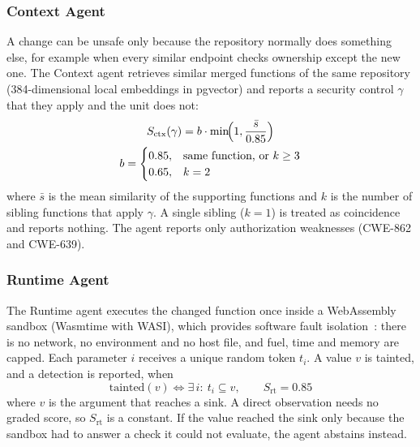 \documentclass[conference]{IEEEtran}
\begin{document}
\subsubsection{Context Agent}
A change can be unsafe only because the repository normally does something
else, for example when every similar endpoint checks ownership except the
new one. The Context agent retrieves similar merged functions of the same
repository (384-dimensional local embeddings in pgvector) and reports a
security control $\gamma$ that they apply and the unit does not:
\begin{equation}
\begin{gathered}
S_{\mathrm{ctx}}(\gamma)=b\cdot\min\!\Bigl(1,\frac{\bar{s}}{0.85}\Bigr)\\
b=\begin{cases}0.85,&\text{same function, or } k\ge3\\0.65,&k=2\end{cases}
\end{gathered}
\label{eq:ctx}
\end{equation}
where $\bar{s}$ is the mean similarity of the supporting functions and $k$
is the number of sibling functions that apply $\gamma$. A single sibling
($k=1$) is treated as coincidence and reports nothing. The agent reports
only authorization weaknesses (CWE-862 and CWE-639).

\subsubsection{Runtime Agent}
The Runtime agent executes the changed function once inside a
WebAssembly~\cite{haas2017wasm} sandbox (Wasmtime with WASI), which
provides software fault isolation~\cite{wahbe1993sfi}: there is no network,
no environment and no host file, and fuel, time and memory are capped.
Each parameter $i$ receives a unique random token $t_i$. A value $v$ is
tainted, and a detection is reported, when
\begin{equation}
\mathrm{tainted}(v)\iff\exists\,i:\ t_i\subseteq v,\qquad S_{\mathrm{rt}}=0.85
\label{eq:rt}
\end{equation}
where $v$ is the argument that reaches a sink. A direct observation needs
no graded score, so $S_{\mathrm{rt}}$ is a constant. If the value reached
the sink only because the sandbox had to answer a check it could not
evaluate, the agent abstains instead.
\end{document}
